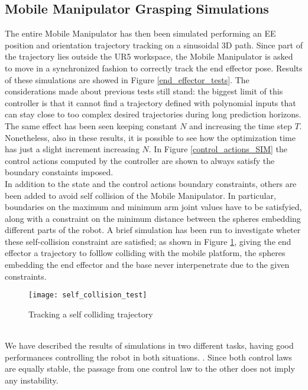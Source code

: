 \subsection{Mobile Manipulator Grasping Simulations}
The entire Mobile Manipulator has then been simulated performing an EE position and orientation trajectory tracking on a sinusoidal 3D path. Since part of the trajectory lies outside the UR5 workspace, the Mobile Manipulator is asked to move in a synchronized fashion to correctly track the end effector pose. 
Results of these simulations are showed in Figure \ref{end_effector_tests}. The considerations made about previous tests still stand: the biggest limit of this controller is that it cannot find a trajectory defined with polynomial inputs that can stay close to too complex desired trajectories during long prediction horizons. The same effect has been seen keeping constant $N$ and increasing the time step $T$. Nonetheless, also in these results, it is possible to see how the optimization time has just a slight increment increasing $N$. In Figure \ref{control_actions_SIM} the control actions computed by the controller are shown to always satisfy the boundary constaints imposed.\\
In addition to the state and the control actions boundary constraints, others are been added to avoid self collision of the Mobile Manipulator. In particular, boundaries on the maximum and minimum arm joint values have to be satisfyied, along with a constraint on the minimum distance between the spheres embedding different parts of the robot. A brief simulation has been run to investigate wheter these self-collision constraint are satisfied; as shown in Figure \ref{self_collision}, giving the end effector a trajectory to folllow colliding with the mobile platform, the spheres embedding the end effector and the base never interpenetrate due to the given constraints.
\begin{figure}[t]
\centering
\texttt{[image: self\_collision\_test]}
\caption{Tracking a self colliding trajectory}
\label{self_collision}
\end{figure}
\\
We have described the results of simulations in two different tasks, having good performances controlling the robot in both situations. . Since both control laws are equally stable, the passage from one control law to the other does not imply any instability.
